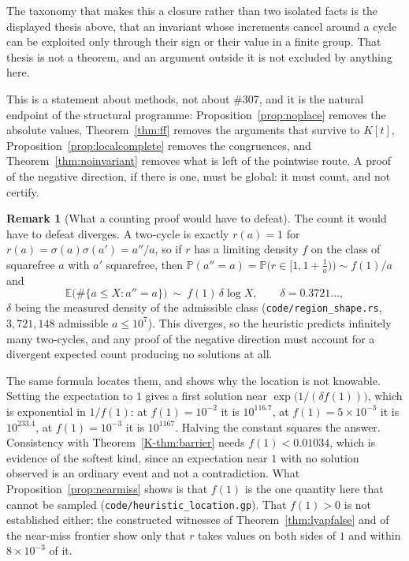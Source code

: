 \documentclass[11pt]{article}
\theoremstyle{definition}
\newtheorem{remark}[theorem]{Remark}
\begin{document}
The taxonomy that makes this a closure rather than two isolated facts is the displayed thesis above,
that an invariant whose increments cancel around a cycle can be exploited only through their sign or
their value in a finite group. That thesis is not a theorem, and an argument outside it is not
excluded by anything here.

This is a statement about methods, not about \#307, and it is the natural endpoint of the structural
programme: Proposition~\ref{prop:noplace} removes the absolute values, Theorem~\ref{thm:ff} removes
the arguments that survive to $K[t]$, Proposition~\ref{prop:localcomplete} removes the congruences,
and Theorem~\ref{thm:noinvariant} removes what is left of the pointwise route. A proof of the
negative direction, if there is one, must be global: it must count, and not certify.

\begin{remark}[What a counting proof would have to defeat]\label{rem:whatcounting}
The count it would have to defeat diverges. A two-cycle is exactly $r(a)=1$ for
$r(a)=\sigma(a)\sigma(a')=a''/a$, so if $r$ has a limiting density $f$ on the class of squarefree $a$
with $a'$ squarefree, then $\mathbb{P}(a''=a)=\mathbb{P}\bigl(r\in[1,1+\tfrac1a)\bigr)\sim f(1)/a$ and
\[ \mathbb{E}\bigl(\#\{a\le X:a''=a\}\bigr)\ \sim\ f(1)\,\delta\log X,\qquad \delta=0.3721\ldots, \]
$\delta$ being the measured density of the admissible class \textup{(\texttt{code/region\_shape.rs},
$3{,}721{,}148$ admissible $a\le10^7$)}. This diverges, so the heuristic predicts infinitely many
two-cycles, and any proof of the negative direction must account for a divergent expected count
producing no solutions at all.

The same formula locates them, and shows why the location is not knowable. Setting the expectation to
$1$ gives a first solution near $\exp\bigl(1/(\delta f(1))\bigr)$, which is exponential in $1/f(1)$:
at $f(1)=10^{-2}$ it is $10^{116.7}$, at $f(1)=5\times10^{-3}$ it is $10^{233.4}$, at $f(1)=10^{-3}$
it is $10^{1167}$. Halving the constant squares the answer. Consistency with
Theorem~\ref{K-thm:barrier} needs $f(1)<0.01034$, which is evidence of the softest kind, since an
expectation near $1$ with no solution observed is an ordinary event and not a contradiction. What
Proposition~\ref{prop:nearmiss} shows is that $f(1)$ is the one quantity here that cannot be sampled
\textup{(\texttt{code/heuristic\_location.gp})}. That $f(1)>0$ is not established either; the
constructed witnesses of Theorem~\ref{thm:lyapfalse} and of the near-miss frontier show only that $r$
takes values on both sides of $1$ and within $8\times10^{-3}$ of it.
\end{remark}
\end{document}
